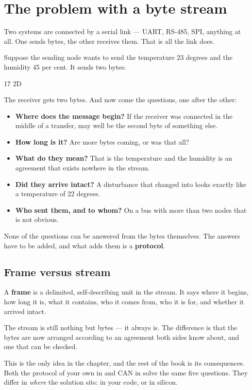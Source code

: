 \section{The problem with a byte stream}
\label{sec:stream}

Two systems are connected by a serial link --- UART, RS-485, SPI, anything at all. One sends
bytes, the other receives them. That is all the link does.

Suppose the sending node wants to send the temperature 23 degrees and the humidity 45 per cent.
It sends two bytes:

\begin{console}
17 2D
\end{console}

The receiver gets two bytes. And now come the questions, one after the other:

\begin{itemize}
  \item \textbf{Where does the message begin?} If the receiver was connected in the middle of a
    transfer,  may well be the second byte of something else.
  \item \textbf{How long is it?} Are more bytes coming, or was that all?
  \item \textbf{What do they mean?} That  is the temperature and  the humidity
    is an agreement that exists nowhere in the stream.
  \item \textbf{Did they arrive intact?} A disturbance that changed  into 
    looks exactly like a temperature of 22 degrees.
  \item \textbf{Who sent them, and to whom?} On a bus with more than two nodes that is not
    obvious.
\end{itemize}

None of the questions can be answered from the bytes themselves. The answers have to be added,
and what adds them is a \textbf{protocol}.

\subsection{Frame versus stream}

A \textbf{frame} is a delimited, self-describing unit in the stream. It says where it begins, how
long it is, what it contains, who it comes from, who it is for, and whether it arrived intact.

The stream is still nothing but bytes --- it always is. The difference is that the bytes are now
arranged according to an agreement both sides know about, and one that can be checked.

\begin{aside}
\note This is the only idea in the chapter, and the rest of the book is its consequences. Both the
protocol of your own in  and CAN in  solve the same five
questions. They differ in \emph{where} the solution sits: in your code, or in silicon.
\end{aside}
